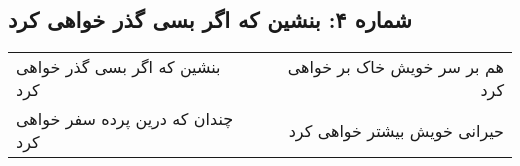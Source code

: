 \begin{center}
\section*{شماره ۴: بنشین که اگر بسی گذر خواهی کرد}
\label{sec:004}
\begin{longtable}{l p{0.5cm} r}
بنشین که اگر بسی گذر خواهی کرد
&&
هم بر سر خویش خاک بر خواهی کرد
\\
چندان که درین پرده سفر خواهی کرد
&&
حیرانی خویش بیشتر خواهی کرد
\\
\end{longtable}
\end{center}
